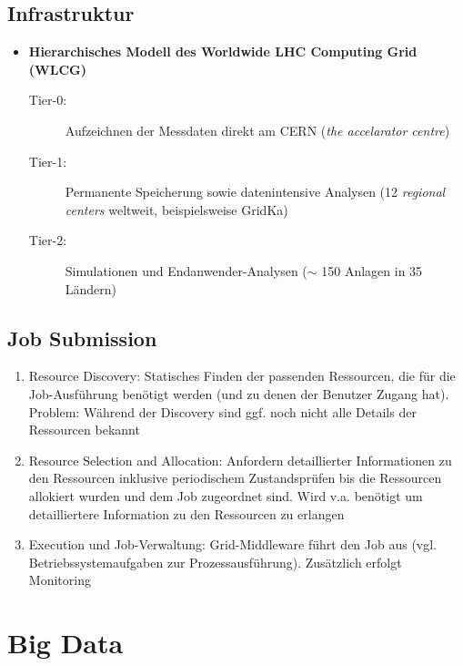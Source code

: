 \subsection{Infrastruktur}
\begin{itemize}
	\item \textbf{Hierarchisches Modell des Worldwide LHC Computing Grid (WLCG)} %
	\begin{description}
		\item[Tier-0:] Aufzeichnen der Messdaten direkt am CERN (\textit{the accelarator centre})
		\item[Tier-1:] Permanente Speicherung sowie datenintensive Analysen (12 \textit{regional centers} weltweit, beispielsweise GridKa)
		\item[Tier-2:] Simulationen und Endanwender-Analysen (\(\sim\) 150 Anlagen in 35 Ländern)
	\end{description}
\end{itemize}


\subsection{Job Submission}
\begin{enumerate}
	\item Resource Discovery: Statisches Finden der passenden Ressourcen, die für die Job-Ausführung benötigt werden (und zu denen der Benutzer Zugang hat). Problem: Während der Discovery sind ggf. noch nicht alle Details der Ressourcen bekannt
	\item Resource Selection and Allocation: Anfordern detaillierter Informationen zu den Ressourcen inklusive periodischem Zustandsprüfen bis die Ressourcen allokiert wurden und dem Job zugeordnet sind. Wird v.a. benötigt um detailliertere Information zu den Ressourcen zu erlangen
	\item Execution und Job-Verwaltung: Grid-Middleware führt den Job aus (vgl. Betriebssystemaufgaben zur Prozessausführung). Zusätzlich erfolgt Monitoring
\end{enumerate}



\section{Big Data}

